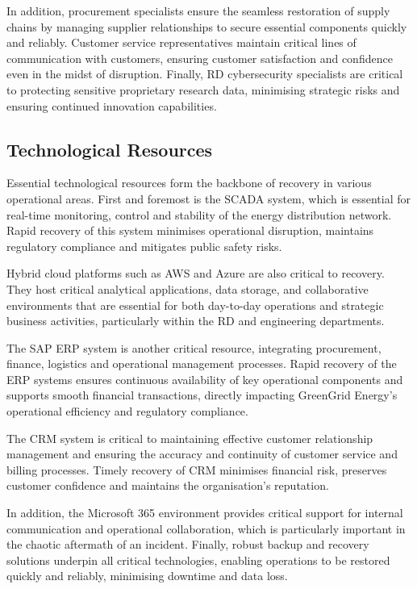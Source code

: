 In addition, procurement specialists ensure the seamless restoration of supply chains by managing supplier relationships to secure essential components quickly and reliably. Customer service representatives maintain critical lines of communication with customers, ensuring customer satisfaction and confidence even in the midst of disruption. Finally, \ac{RD} cybersecurity specialists are critical to protecting sensitive proprietary research data, minimising strategic risks and ensuring continued innovation capabilities.

\subsection{Technological Resources}

Essential technological resources form the backbone of recovery in various operational areas. First and foremost is the \ac{SCADA} system, which is essential for real-time monitoring, control and stability of the energy distribution network. Rapid recovery of this system minimises operational disruption, maintains regulatory compliance and mitigates public safety risks.

Hybrid cloud platforms such as AWS and Azure are also critical to recovery. They host critical analytical applications, data storage, and collaborative environments that are essential for both day-to-day operations and strategic business activities, particularly within the \ac{RD} and engineering departments.

The \ac{SAP} \ac{ERP} system is another critical resource, integrating procurement, finance, logistics and operational management processes. Rapid recovery of the \ac{ERP} systems ensures continuous availability of key operational components and supports smooth financial transactions, directly impacting GreenGrid Energy's operational efficiency and regulatory compliance.

The \ac{CRM} system is critical to maintaining effective customer relationship management and ensuring the accuracy and continuity of customer service and billing processes. Timely recovery of \ac{CRM} minimises financial risk, preserves customer confidence and maintains the organisation's reputation.

In addition, the Microsoft 365 environment provides critical support for internal communication and operational collaboration, which is particularly important in the chaotic aftermath of an incident. Finally, robust backup and recovery solutions underpin all critical technologies, enabling operations to be restored quickly and reliably, minimising downtime and data loss.


